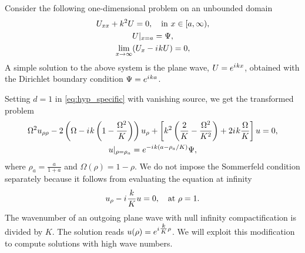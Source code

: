 \documentclass[draft,onefignum,onetabnum]{siamart190516}
\newcommand{\iu}{{i\mkern1mu}}
\begin{document}
Consider the following one-dimensional problem on an unbounded domain
\begin{equation}
	\label{eq:oneD}
	\begin{gathered}
		U_{xx} + k^2 U = 0, \quad \mathrm{in} \ x\in[a,\infty),\\
		U|_{x=a} = \Psi,\\
		\lim_{x\to\infty} (U_x - \iu k U) = 0,
	\end{gathered}
\end{equation}
A simple solution to the above system is the plane wave, $U=e^{\iu k x}$, obtained with the Dirichlet boundary condition $\Psi=e^{\iu k a}$. 

Setting $d=1$ in \eqref{eq:hyp_specific} with vanishing source, we get the transformed problem
\begin{equation}
	\label{eq:hyp_1d}
	\begin{gathered}
		\Omega^2 u_{\rho\rho} - 2 \left(\Omega-\iu k \left(1-\frac{\Omega^2}{K}\right) \right) u_\rho + \left[k^2 \left(\frac{2}{K}-\frac{\Omega^2}{K^2}\right) + 2 \iu k \frac{\Omega}{K} \right] u = 0,\\
		u|_{\rho=\rho_a} = e^{-\iu k (a-\rho_a/K)}\Psi,
	\end{gathered}
\end{equation}
where $\rho_a=\tfrac{a}{1+a}$ and $\Omega(\rho)=1-\rho$. We do not impose the Sommerfeld condition separately because it follows from evaluating the equation at infinity 
\[ u_\rho - \iu \frac{k}{K} u = 0,   \quad \mathrm{at} \ \rho=1. \]
The wavenumber of an outgoing plane wave with null infinity compactification is divided by $K$. The solution reads $u(\rho)=e^{\iu \tfrac{k}{K} \rho}$. We will exploit this modification to compute solutions with high wave numbers.
\end{document}
